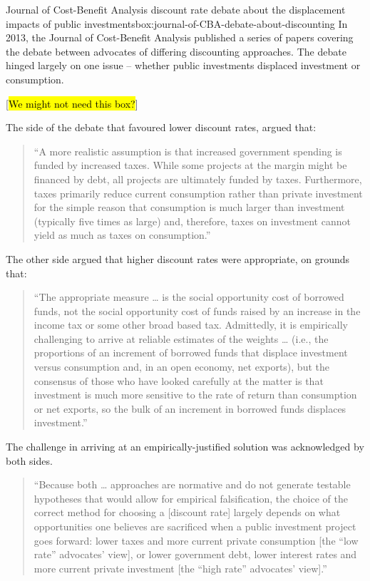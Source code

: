 \begin{bigbox}{Journal of Cost-Benefit Analysis discount rate debate about the displacement impacts of public investments}{box:journal-of-CBA-debate-about-discounting}
In 2013, the Journal of Cost-Benefit Analysis published a series of papers covering the debate between advocates of differing discounting approaches. The debate hinged largely on one issue – whether public investments displaced investment or consumption. 

[\hl{We might not need this box?}]

The side of the debate that favoured lower discount rates, argued that:

\begin{quote}
\textquotedblleft {\small A more realistic assumption is that increased government spending is funded by increased taxes. While some projects at the margin might be financed by debt, all projects are ultimately funded by taxes. Furthermore, taxes primarily reduce current consumption rather than private investment for the simple reason that consumption is much larger than investment (typically five times as large) and, therefore, taxes on investment cannot yield as much as taxes on consumption.”}
\end{quote}
The other side argued that higher discount rates were appropriate, on grounds that: 

\begin{quote}
\textquotedblleft {\small The appropriate measure … is the social opportunity cost of borrowed funds, not the social opportunity cost of funds raised by an increase in the income tax or some other broad based tax. Admittedly, it is empirically challenging to arrive at reliable estimates of the weights … (i.e., the proportions of an increment of borrowed funds that displace investment versus consumption and, in an open economy, net exports), but the consensus of those who have looked carefully at the matter is that investment is much more sensitive to the rate of return than consumption or net exports, so the bulk of an increment in borrowed funds displaces investment.”}
\end{quote}

The challenge in arriving at an empirically-justified solution was acknowledged by both sides.

\begin{quote}
\textquotedblleft {\small Because both … approaches are normative and do not generate testable hypotheses that would allow for empirical falsification, the choice of the correct method for choosing a [discount rate] largely depends on what opportunities one believes are sacrificed when a public investment project goes forward: lower taxes and more current private consumption [the ``low rate'' advocates' view], or lower government debt, lower interest rates and more current private investment [the ``high rate'' advocates' view].”}
\end{quote}


\end{bigbox}
